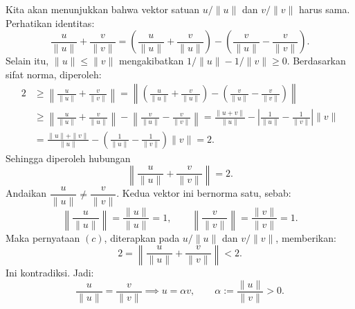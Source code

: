 \documentclass[aspectratio=169,11pt]{beamer}
\theoremstyle{definition}
\begin{document}
\begin{frame}[allowframebreaks]{\insertsection}{\insertsubsection}
\begin{itemize}
          Kita akan menunjukkan bahwa vektor satuan $u/\|u\|$ dan $v/\|v\|$ harus sama. Perhatikan identitas:
          \begin{equation*}
            \frac{u}{\|u\|} + \frac{v}{\|v\|}
            = \left(\frac{u}{\|u\|} + \frac{v}{\|u\|}\right)
            - \left(\frac{v}{\|u\|} - \frac{v}{\|v\|}\right).
          \end{equation*}
          Selain itu, $\|u\| \leq \|v\|$ mengakibatkan $1/\|u\| - 1/\|v\| \geq 0$. Berdasarkan sifat norma, diperoleh:
          \begin{align*}
            2 & \geq \left\|\frac{u}{\|u\|} + \frac{v}{\|v\|}\right\| = \left\|\left(\frac{u}{\|u\|} + \frac{v}{\|u\|}\right)
            - \left(\frac{v}{\|u\|} - \frac{v}{\|v\|}\right)\right\|                                                          \\
              & \geq \left\|\frac{u}{\|u\|} + \frac{v}{\|u\|}\right\|
            - \left\|\frac{v}{\|u\|} - \frac{v}{\|v\|}\right\|          = \frac{\|u+v\|}{\|u\|}
            - \left|\frac{1}{\|u\|} - \frac{1}{\|v\|}\right|\|v\|                                                             \\
              & = \frac{\|u\| + \|v\|}{\|u\|}
            - \left(\frac{1}{\|u\|} - \frac{1}{\|v\|}\right)\|v\| = 2.
          \end{align*}
          Sehingga diperoleh hubungan
          \begin{equation*}
            \left\|\frac{u}{\|u\|} + \frac{v}{\|v\|}\right\| = 2.
          \end{equation*}
          Andaikan $\dfrac{u}{\|u\|}\neq\dfrac{v}{\|v\|}$. Kedua vektor ini bernorma satu, sebab:
          \begin{equation*}
            \left\|\frac{u}{\|u\|}\right\|=\frac{\|u\|}{\|u\|}=1,
            \qquad
            \left\|\frac{v}{\|v\|}\right\|=\frac{\|v\|}{\|v\|}=1.
          \end{equation*}
          Maka pernyataan $(c)$, diterapkan pada $u/\|u\|$ dan $v/\|v\|$, memberikan:
          \begin{equation*}
            2=\left\|\frac{u}{\|u\|}+\frac{v}{\|v\|}\right\|<2.
          \end{equation*}
          Ini kontradiksi. Jadi:
          \begin{equation*}
            \frac{u}{\|u\|} = \frac{v}{\|v\|}
            \implies u = \alpha v, \qquad \alpha := \frac{\|u\|}{\|v\|} > 0.
          \end{equation*}

\end{itemize}
\end{frame}
\end{document}
